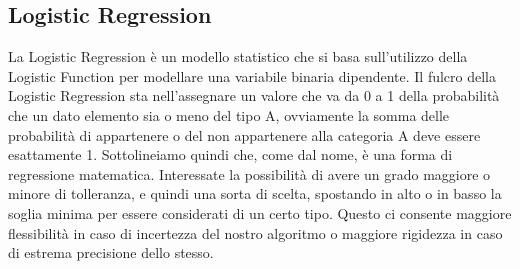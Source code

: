 \subsection{Logistic Regression}
La Logistic Regression  è un modello statistico che si basa sull'utilizzo della Logistic Function per modellare una variabile binaria dipendente. Il fulcro della Logistic Regression sta nell'assegnare un valore che va da 0 a 1 della probabilità che un dato elemento sia o meno del tipo A, ovviamente la somma delle probabilità di appartenere o del non appartenere alla categoria A deve essere esattamente 1. Sottolineiamo quindi che, come dal nome, è una forma di regressione matematica. Interessate la possibilità di avere un grado maggiore o minore di tolleranza, e quindi una sorta di scelta, spostando in alto o in basso la soglia minima per essere considerati di un certo tipo. Questo ci consente maggiore flessibilità in caso di incertezza del nostro algoritmo o maggiore rigidezza in caso di estrema precisione dello stesso.